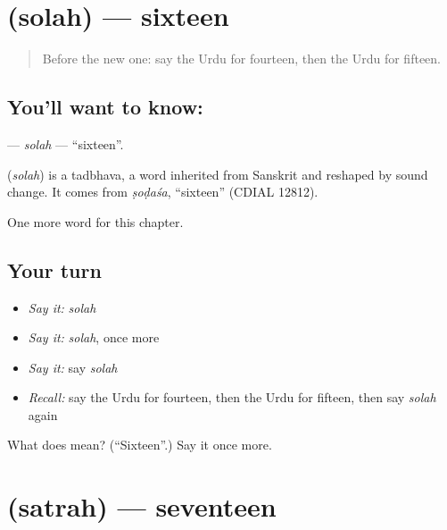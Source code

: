 \section[\texorpdfstring{\ur{سولہ} (solah)}{سولہ (solah)}]{ (solah) — sixteen}

\label{lesson:UR-C84-solah}



\begin{quote}
Before the new one: say the Urdu for fourteen, then the Urdu for fifteen.
\end{quote}

\subsection*{You'll want to know: }
\textbf{} — \emph{solah} — \textquotedblleft{}sixteen\textquotedblright{}.

\begin{cousinweb}
\textbf{} (\emph{solah}) is a tadbhava, a word inherited from Sanskrit and reshaped by sound change. It comes from \emph{ṣoḍaśa}, \textquotedblleft{}sixteen\textquotedblright{} (CDIAL 12812).
\end{cousinweb}

\begin{grammarlens}[title={What you've built}]
One more word for this chapter.
\end{grammarlens}

\subsection*{Your turn}
\begin{itemize}
\raggedright
  \item \emph{Say it:} \emph{solah}
  \item \emph{Say it:} \emph{solah}, once more
  \item \emph{Say it:} say \emph{solah}
  \item \emph{Recall:} say the Urdu for fourteen, then the Urdu for fifteen, then say \emph{solah} again
\end{itemize}

\begin{tcolorbox}[breakable,colback=teal!4,colframe=teal!35!black,title={Before you move on}]
What does  mean? (\textquotedblleft{}Sixteen\textquotedblright{}.) Say it once more.
\end{tcolorbox}
\section[\texorpdfstring{\ur{سترہ} (satrah)}{سترہ (satrah)}]{ (satrah) — seventeen}

